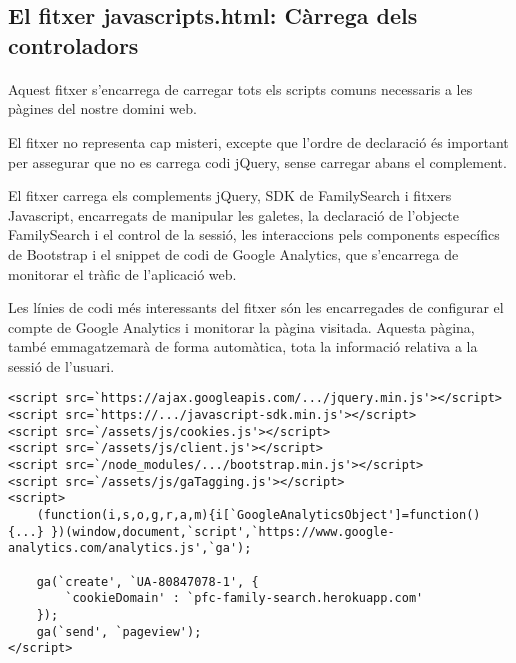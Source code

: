 \subsection{El fitxer javascripts.html: Càrrega dels controladors}

    \paragraph{}
    Aquest fitxer s'encarrega de carregar tots els scripts comuns necessaris a les pàgines del nostre domini web.

    El fitxer no representa cap misteri, excepte que l'ordre de declaració és important per assegurar que no es carrega codi jQuery, sense carregar abans el complement.

    El fitxer carrega els complements jQuery, SDK de FamilySearch i fitxers Java\-script, encarregats de manipular les galetes, la declaració de l'objecte FamilySearch i el control de la sessió, les interaccions pels components específics de Bootstrap i el snippet de codi de Google Analytics, que s'encarrega de monitorar el tràfic de l'aplicació web.

    Les línies de codi més interessants del fitxer són les encarregades de configurar el compte de Google Analytics i monitorar la pàgina visitada. Aquesta pàgina, també emmagatzemarà de forma automàtica, tota la informació relativa a la sessió de l'usuari.

    \begin{lstlisting}[style=rawOwn,caption={Càrrega general de controladors per totes les pàgines}]
<script src=`https://ajax.googleapis.com/.../jquery.min.js'></script>
<script src=`https://.../javascript-sdk.min.js'></script>
<script src=`/assets/js/cookies.js'></script>
<script src=`/assets/js/client.js'></script>
<script src=`/node_modules/.../bootstrap.min.js'></script>
<script src=`/assets/js/gaTagging.js'></script>
<script>
    (function(i,s,o,g,r,a,m){i[`GoogleAnalyticsObject']=function(){...} })(window,document,`script',`https://www.google-analytics.com/analytics.js',`ga');

    ga(`create', `UA-80847078-1', {
        `cookieDomain' : `pfc-family-search.herokuapp.com'
    });
    ga(`send', `pageview');
</script>
    \end{lstlisting}
